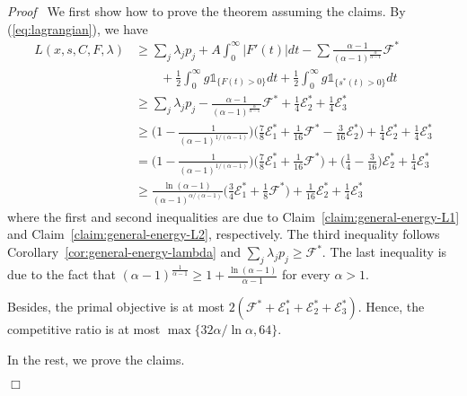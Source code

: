 \documentclass[11pt]{article}
\newenvironment{proof}{\noindent\emph{Proof\ }}{\hspace*{\fill}$\Box$\medskip}
\newcommand{\one}{\ensuremath{\mathds{1}}}
\begin{document}
\begin{proof}
We first show how to prove the theorem assuming the claims.
By (\ref{eq:lagrangian}), we have
\begin{align*}
L(x,s,C, F, \lambda) 
	&\geq \sum_{j} \lambda_{j}p_{j}  + A \int_{0}^{\infty} |F'(t)|dt
			- \sum\frac{\alpha-1}{(\alpha-1)^{\frac{\alpha}{\alpha-1}}} \mathcal{F}^{*} \\
			& \qquad + \frac{1}{2} \int_{0}^{\infty} g \one_{\{F(t) > 0\}} dt 
			+ \frac{1}{2} \int_{0}^{\infty} g\one_{\{s^{*}(t) > 0\}} dt \\
&\geq \sum_{j}\lambda_{j}p_{j}  
			- \frac{\alpha-1}{(\alpha-1)^{\frac{\alpha}{\alpha-1}}} \mathcal{F}^{*}
			+ \frac{1}{4}\mathcal{E}^{*}_{2} + \frac{1}{4}\mathcal{E}^{*}_{3}   \\
&\geq \biggl( 1 - \frac{1}{(\alpha-1)^{1/(\alpha-1)}} \biggl) 
		\biggl( \frac{7}{8}\mathcal{E}^{*}_{1} + 
			 \frac{1}{16}\mathcal{F}^{*} - \frac{3}{16} \mathcal{E}^{*}_{2}
			 \biggl) 
		+ \frac{1}{4}\mathcal{E}^{*}_{2} + \frac{1}{4}\mathcal{E}^{*}_{3}\\
&=  \biggl( 1 - \frac{1}{(\alpha-1)^{1/(\alpha-1)}} \biggl) 
		\biggl( \frac{7}{8}\mathcal{E}^{*}_{1} + \frac{1}{16}\mathcal{F}^{*} \biggl) 
		+ \biggl( \frac{1}{4} - \frac{3}{16} \biggl) \mathcal{E}^{*}_{2} + \frac{1}{4}\mathcal{E}^{*}_{3}\\
&\geq  \frac{\ln (\alpha-1)}{(\alpha-1)^{\alpha/(\alpha-1)}} 
		\biggl( \frac{3}{4}\mathcal{E}^{*}_{1} + \frac{1}{8}\mathcal{F}^{*} \biggl) 
		+ \frac{1}{16} \mathcal{E}^{*}_{2} + \frac{1}{4}\mathcal{E}^{*}_{3}		
\end{align*}
where the first and second inequalities are due to Claim~\ref{claim:general-energy-L1} and
Claim~\ref{claim:general-energy-L2}, respectively. The third inequality follows
Corollary~\ref{cor:general-energy-lambda} and $\sum_{j} \lambda_{j}p_{j} \geq \mathcal{F}^{*}$. 
The last inequality is due to the fact that
$(\alpha-1)^{\frac{1}{\alpha-1}} \geq 1 + \frac{\ln (\alpha-1)}{\alpha-1}$
for every $\alpha > 1$.

Besides, the primal objective is at most
$
2(\mathcal{F}^{*} + \mathcal{E}^{*}_{1} + \mathcal{E}^{*}_{2} + \mathcal{E}^{*}_{3})
$. 
Hence, the competitive ratio is at most $\max\{32\alpha/\ln \alpha,64\}$.


In the rest, we prove the claims.


\end{proof}
\end{document}
